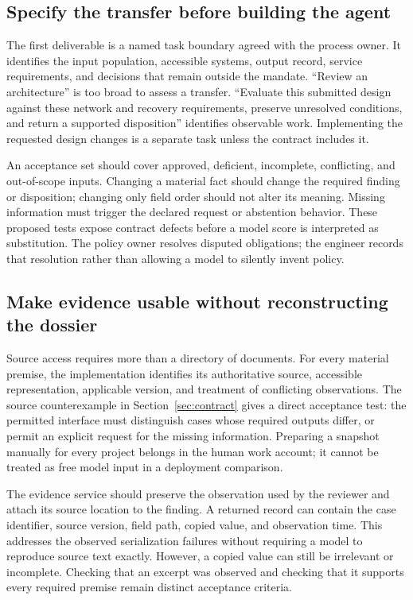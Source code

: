 \subsection{Specify the transfer before building the agent}

The first deliverable is a named task boundary agreed with the process owner. It identifies
the input population, accessible systems, output record, service requirements, and decisions
that remain outside the mandate. ``Review an architecture'' is too broad to assess a transfer.
``Evaluate this submitted design against these network and recovery requirements, preserve
unresolved conditions, and return a supported disposition'' identifies observable work.
Implementing the requested design changes is a separate task unless the contract includes it.

An acceptance set should cover approved, deficient, incomplete, conflicting, and out-of-scope
inputs. Changing a material fact should change the required finding or disposition; changing
only field order should not alter its meaning. Missing information must trigger the declared
request or abstention behavior. These proposed tests expose contract defects before a model
score is interpreted as substitution. The policy owner resolves disputed obligations; the
engineer records that resolution rather than allowing a model to silently invent policy.

\subsection{Make evidence usable without reconstructing the dossier}

Source access requires more than a directory of documents. For every material premise, the
implementation identifies its authoritative source, accessible representation, applicable
version, and treatment of conflicting observations. The source counterexample in
Section~\ref{sec:contract} gives a direct acceptance test: the permitted interface must
distinguish cases whose required outputs differ, or permit an explicit request for the
missing information. Preparing a snapshot manually for every project belongs in the human
work account; it cannot be treated as free model input in a deployment comparison.

The evidence service should preserve the observation used by the reviewer and attach its
source location to the finding. A returned record can contain the case identifier, source
version, field path, copied value, and observation time. This addresses the observed
serialization failures without requiring a model to reproduce source text exactly. However,
a copied value can still be irrelevant or incomplete. Checking that an excerpt was observed
and checking that it supports every required premise remain distinct acceptance criteria.

